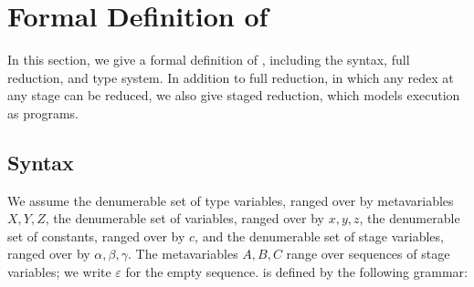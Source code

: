 \section{Formal Definition of \LMD}

In this section, we give a formal definition of \LMD, including
the syntax, full reduction, and type system.  In addition to full reduction,
in which any redex at any stage can be reduced, we also give staged reduction,
which models execution as programs.

\subsection{Syntax}

We assume the denumerable set of type variables, ranged over by
metavariables \(X, Y, Z\), the denumerable set of variables, ranged
over by \(x,y,z\), the denumerable set of constants, ranged over by
\(c\), and the denumerable set of stage variables, ranged over by
\(\alpha, \beta, \gamma\).  The metavariables \(A, B, C\) range over
sequences of stage variables; we write \(\varepsilon\) for the empty
sequence.    \LMD is defined by the following grammar:


